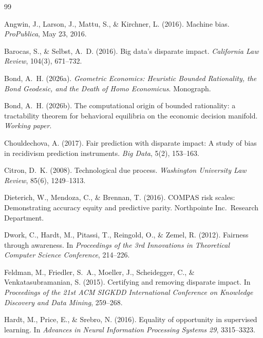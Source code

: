 \documentclass[11pt]{article}
\begin{document}

\begin{thebibliography}{99}

Angwin, J., Larson, J., Mattu, S., \& Kirchner, L. (2016).
Machine bias.
\emph{ProPublica}, May 23, 2016.

Barocas, S., \& Selbst, A.~D. (2016).
Big data's disparate impact.
\emph{California Law Review}, 104(3), 671--732.

Bond, A.~H. (2026a).
\emph{Geometric Economics: Heuristic Bounded Rationality, the Bond
Geodesic, and the Death of Homo Economicus}. Monograph.

Bond, A.~H. (2026b).
The computational origin of bounded rationality: a tractability
theorem for behavioral equilibria on the economic decision manifold.
\emph{Working paper}.

Chouldechova, A. (2017).
Fair prediction with disparate impact: A study of bias in recidivism
prediction instruments.
\emph{Big Data}, 5(2), 153--163.

Citron, D.~K. (2008).
Technological due process.
\emph{Washington University Law Review}, 85(6), 1249--1313.

Dieterich, W., Mendoza, C., \& Brennan, T. (2016).
COMPAS risk scales: Demonstrating accuracy equity and predictive
parity. Northpointe Inc.\ Research Department.

Dwork, C., Hardt, M., Pitassi, T., Reingold, O., \& Zemel, R. (2012).
Fairness through awareness.
In \emph{Proceedings of the 3rd Innovations in Theoretical Computer
Science Conference}, 214--226.

Feldman, M., Friedler, S.~A., Moeller, J., Scheidegger, C., \&
Venkatasubramanian, S. (2015).
Certifying and removing disparate impact.
In \emph{Proceedings of the 21st ACM SIGKDD International Conference
on Knowledge Discovery and Data Mining}, 259--268.

Hardt, M., Price, E., \& Srebro, N. (2016).
Equality of opportunity in supervised learning.
In \emph{Advances in Neural Information Processing Systems 29},
3315--3323.


\end{thebibliography}
\end{document}
